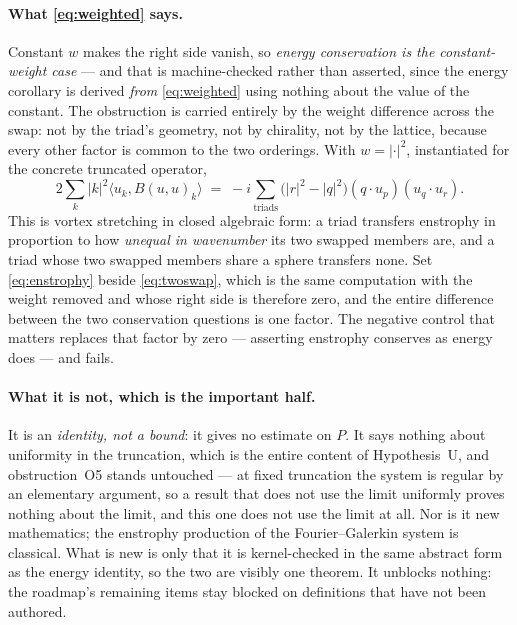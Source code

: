 \documentclass[11pt,a4paper]{article}
\theoremstyle{definition}
\theoremstyle{plain}
\begin{document}
\paragraph{What \eqref{eq:weighted} says.}
Constant $w$ makes the right side vanish, so \emph{energy conservation is the constant-weight case}
--- and that is machine-checked rather than asserted, since the energy corollary is derived
\emph{from} \eqref{eq:weighted} using nothing about the value of the constant. The obstruction is
carried entirely by the weight difference across the swap: not by the triad's geometry, not by
chirality, not by the lattice, because every other factor is common to the two orderings. With
$w=|\cdot|^2$, instantiated for the concrete truncated operator,
\begin{equation}
  2\sum_k|k|^2\langle u_k,B(u,u)_k\rangle
    \;=\; -i\sum_{\text{triads}}\bigl(|r|^2-|q|^2\bigr)(q\!\cdot\! u_p)(u_q\!\cdot\! u_r).
  \label{eq:enstrophy}
\end{equation}
This is vortex stretching in closed algebraic form: a triad transfers enstrophy in proportion to how
\emph{unequal in wavenumber} its two swapped members are, and a triad whose two swapped members
share a sphere transfers none. Set \eqref{eq:enstrophy} beside \eqref{eq:twoswap}, which is the same
computation with the weight removed and whose right side is therefore zero, and the entire
difference between the two conservation questions is one factor. The negative control that matters
replaces that factor by zero --- asserting enstrophy conserves as energy does --- and fails.

\paragraph{What it is not, which is the important half.}
It is an \emph{identity, not a bound}: it gives no estimate on $P$. It says nothing about uniformity
in the truncation, which is the entire content of Hypothesis~U, and obstruction~O5 stands untouched
--- at fixed truncation the system is regular by an elementary argument, so a result that does not
use the limit uniformly proves nothing about the limit, and this one does not use the limit at all.
Nor is it new mathematics; the enstrophy production of the Fourier--Galerkin system is classical.
What is new is only that it is kernel-checked in the same abstract form as the energy identity, so
the two are visibly one theorem. It unblocks nothing: the roadmap's remaining items stay blocked on
definitions that have not been authored.
\end{document}
